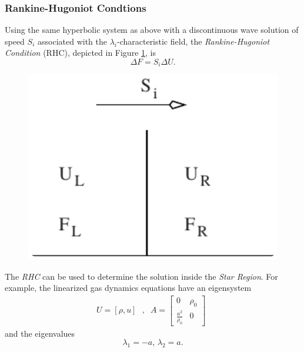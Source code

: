 \documentclass[]{article}
\begin{document}
		\subsubsection{Rankine-Hugoniot Condtions}
		Using the same hyperbolic system as above with a discontinuous wave solution of speed $ S_i $ associated with the $ \lambda_i $-characteristic field, the \textit{Rankine-Hugoniot Condition} (RHC), depicted in Figure \ref{RankineHugoniot}, is
		\begin{equation}
		\Delta F = S_i \Delta U.
		\end{equation}		
		\begin{figure}[h] 	
			\centering
			\includegraphics[scale=.55]{RankineHugoniot}
			\caption{}
			\label{RankineHugoniot}
		\end{figure}
		The \textit{RHC} can be used to determine the solution inside the \textit{Star Region}. For example, the linearized gas dynamics equations have an eigensystem
		\begin{equation}	
		U = [\rho, u] \mbox{ } \mbox{, }		
		\begin{aligned}
		A =\left[
		\begin{array}{ll}
		0 & \rho_0\\
		\frac{a^2}{\rho_0} & 0 
		\end{array}
		\right]
		\end{aligned}
		\end{equation}
		and the eigenvalues
		\begin{equation}
		\lambda_1 = -a \mbox{, } \lambda_2 = a.
		\end{equation}
\end{document}
